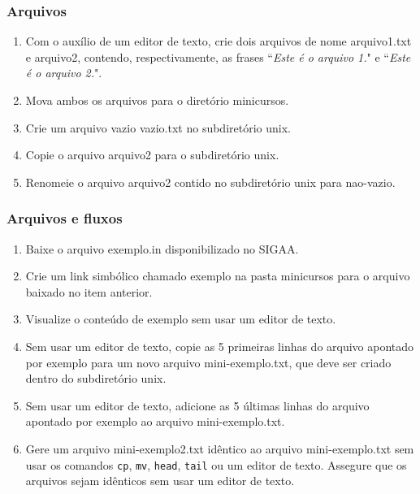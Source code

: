 \documentclass[a4paper,10pt,titlepage,twosided]{book}
\begin{document}
\subsubsection{Arquivos}

\begin{enumerate}
\medskip
\item Com o auxílio de um editor de texto, crie dois arquivos de nome \textsf{arquivo1.txt} e \textsf{arquivo2}, contendo, respectivamente, as frases ``\emph{Este é o arquivo 1.}" e ``\emph{Este é o arquivo 2.}".
\item Mova ambos os arquivos para o diretório \textsf{minicursos}.
\item Crie um arquivo vazio \textsf{vazio.txt} no subdiretório \textsf{unix}.
\item Copie o arquivo \textsf{arquivo2} para o subdiretório \textsf{unix}.
\item Renomeie o arquivo \textsf{arquivo2} contido no subdiretório \textsf{unix} para \textsf{nao-vazio}.
\end{enumerate}

\subsubsection{Arquivos e fluxos}

\begin{enumerate}
\medskip
\item Baixe o arquivo \textsf{exemplo.in} disponibilizado no SIGAA.
\item Crie um link simbólico chamado \textsf{exemplo} na pasta minicursos para o arquivo baixado no item anterior.
\item Visualize o conteúdo de \textsf{exemplo} sem usar um editor de texto.
\item Sem usar um editor de texto, copie as 5 primeiras linhas do arquivo apontado por \textsf{exemplo} para um novo arquivo \textsf{mini-exemplo.txt}, que deve ser criado dentro do subdiretório \textsf{unix}.
\item Sem usar um editor de texto, adicione as 5 últimas linhas do arquivo apontado por \textsf{exemplo} ao arquivo \textsf{mini-exemplo.txt}.
\item Gere um arquivo \textsf{mini-exemplo2.txt} idêntico ao arquivo \textsf{mini-exemplo.txt} sem usar os comandos \texttt{cp}, \texttt{mv}, \texttt{head}, \texttt{tail} ou um editor de texto. Assegure que os arquivos sejam idênticos sem usar um editor de texto.
\end{enumerate}
\end{document}

